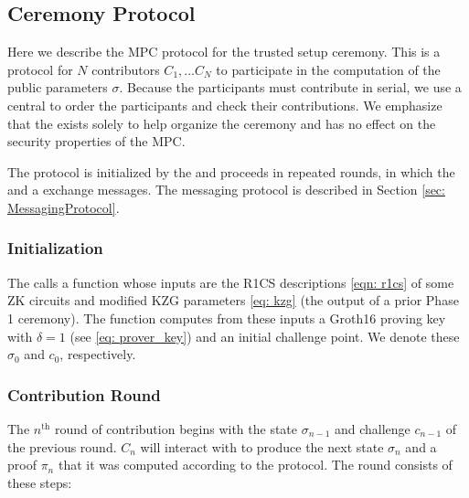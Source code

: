 \subsection{Ceremony Protocol}

Here we describe the MPC protocol for the trusted setup ceremony. This is a protocol for $N$ contributors $C_1, \ldots C_N$ to participate in the computation of the public parameters $\sigma$. Because the participants must contribute in serial, we use a central \Coordinator{} to order the participants and check their contributions. We emphasize that the \Coordinator{} exists solely to help organize the ceremony and has no effect on the security properties of the MPC.

The protocol is initialized by the \Coordinator{} and proceeds in repeated rounds, in which the \Coordinator{} and a \Contributor{} exchange messages. The messaging protocol is described in Section \ref{sec: MessagingProtocol}.

\subsubsection*{Initialization}

The \Coordinator{} calls a function \initialize{} whose inputs are the R1CS descriptions \eqref{eqn: r1cs} of some ZK circuits and modified KZG parameters \eqref{eq: kzg} (the output of a prior Phase 1 ceremony). The function \initialize{} computes from these inputs a Groth16 proving key with $\delta = 1$ (see \eqref{eq: prover_key}) and an initial challenge point. We denote these $\sigma_0$ and  $c_0$, respectively.

\subsubsection*{Contribution Round}

The $n^{\text{th}}$ round of contribution begins with the state $\sigma_{n-1}$ and challenge $c_{n-1}$ of the previous round. \Contributor{} $C_n$ will interact with \Coordinator{} to produce the next state $\sigma_{n}$ and a proof $\pi_{n}$ that it was computed according to the protocol. The round consists of these steps:

